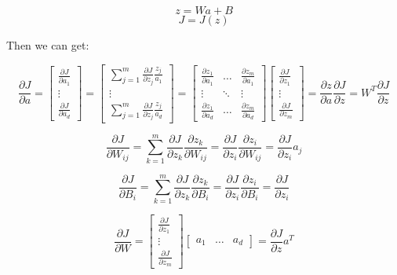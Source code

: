 \documentclass{article}
\begin{document}
\[z = W a + B\]
\[J = J(z)\]

\noindent Then we can get:

\[
\frac{\partial J}{\partial a} = 
\begin{bmatrix}
\frac{\partial J}{\partial a_1}\\
\vdots\\
\frac{\partial J}{\partial a_d}
\end{bmatrix}
= 
\begin{bmatrix}
\sum_{j = 1}^m \frac{\partial J}{\partial z_j} \frac{z_j}{a_1}\\
\vdots\\
\sum_{j = 1}^m \frac{\partial J}{\partial z_j} \frac{z_j}{a_d}
\end{bmatrix}
=
\begin{bmatrix}
\frac{\partial z_1}{\partial a_1} & \dots & \frac{\partial z_m}{\partial a_1}\\
\vdots & \ddots & \vdots\\
\frac{\partial z_1}{\partial a_d} & \dots & \frac{\partial z_m}{\partial a_d}
\end{bmatrix}
\begin{bmatrix}
\frac{\partial J}{\partial z_1}\\
\vdots\\
\frac{\partial J}{\partial z_m}
\end{bmatrix}
= \frac{\partial z}{\partial a} \frac{\partial J}{\partial z}
= W^T \frac{\partial J}{\partial z}
\]

\[
\frac{\partial J}{\partial W_{ij}} = \sum_{k = 1}^m \frac{\partial J}{\partial z_k} \frac{\partial z_k}{\partial W_{ij}} = \frac{\partial J}{\partial z_i} \frac{\partial z_i}{\partial W_{ij}} = \frac{\partial J}{\partial z_i} a_j
\]

\[
\frac{\partial J}{\partial B_{i}} = \sum_{k = 1}^m \frac{\partial J}{\partial z_k} \frac{\partial z_k}{\partial B_{i}} = \frac{\partial J}{\partial z_i} \frac{\partial z_i}{\partial B_{i}} = \frac{\partial J}{\partial z_i}
\]

\[
\frac{\partial J}{\partial W} = 
\begin{bmatrix}
\frac{\partial J}{\partial z_1}\\
\vdots\\
\frac{\partial J}{\partial z_m}
\end{bmatrix}
\begin{bmatrix}
a_1 & \dots & a_d
\end{bmatrix}
= \frac{\partial J}{\partial z} a^T
\]
\end{document}
